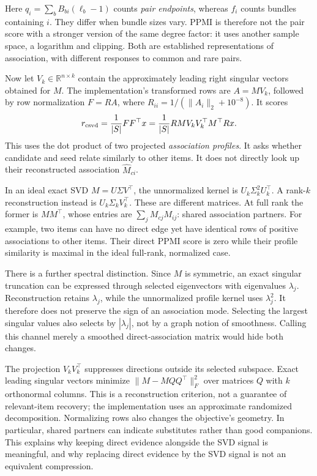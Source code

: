 \documentclass[11pt,a4paper]{article}
\begin{document}
Here $q_i=\sum_bB_{bi}(\ell_b-1)$ counts \emph{pair endpoints}, whereas $f_i$
counts bundles containing $i$. They differ when bundle sizes vary. PPMI is
therefore not the pair score with a stronger version of the same degree factor:
it uses another sample space, a logarithm and clipping. Both are established
representations of association, with different responses to common and rare pairs.

Now let $V_k\in\mathbb R^{n\times k}$ contain the approximately leading right
singular vectors obtained for $M$. The implementation's transformed rows are
$A=MV_k$, followed by row normalization
$F=RA$, where $R_{ii}=1/(\|A_i\|_2+10^{-8})$. It scores
\begin{equation}\label{svd}
 r_{\rm csvd}=\frac1{|S|}FF^\top x
 =\frac1{|S|}R M V_kV_k^\top M^\top R x.
\end{equation}
This uses the dot product of two projected \emph{association profiles}. It asks
whether candidate and seed relate similarly to other items. It does not directly
look up their reconstructed association $\widehat M_{ci}$.

In an ideal exact SVD $M=U\Sigma V^\top$, the unnormalized kernel is
$U_k\Sigma_k^2U_k^\top$. A rank-$k$ reconstruction instead is
$U_k\Sigma_kV_k^\top$. These are different matrices. At full rank the former
is $MM^\top$, whose entries are $\sum_jM_{cj}M_{ij}$: shared association partners.
For example, two items can have no direct edge yet have identical rows of positive
associations to other items. Their direct PPMI score is zero while their
profile similarity is maximal in the ideal full-rank, normalized case.

There is a further spectral distinction. Since $M$ is symmetric, an exact singular
truncation can be expressed through selected eigenvectors with eigenvalues
$\lambda_j$. Reconstruction retains $\lambda_j$, while the unnormalized profile
kernel uses $\lambda_j^2$. It therefore does not preserve the sign of an
association mode. Selecting the largest singular values also selects by
$|\lambda_j|$, not by a graph notion of smoothness. Calling this channel merely a
smoothed direct-association matrix would hide both changes.

The projection $V_kV_k^\top$ suppresses directions outside its selected subspace.
Exact leading singular vectors minimize
$\|M-MQQ^\top\|_F^2$ over matrices $Q$ with $k$ orthonormal columns. This is a
reconstruction criterion, not a guarantee of relevant-item recovery; the
implementation uses an approximate randomized decomposition. Normalizing rows
also changes the objective's geometry. In particular, shared partners can indicate
substitutes rather than good companions. This explains why keeping direct evidence
alongside the SVD signal is meaningful, and why replacing direct evidence by the
SVD signal is not an equivalent compression.
\end{document}
